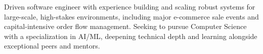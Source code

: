 

\begin{cvparagraph}

Driven software engineer with experience building and scaling 
robust systems for large-scale, high-stakes environments, 
including major e-commerce sale events and capital-intensive order 
flow management. Seeking to pursue Computer Science with a
specialization in AI/ML, deepening technical depth and 
 learning alongside exceptional peers and mentors.
\end{cvparagraph}
